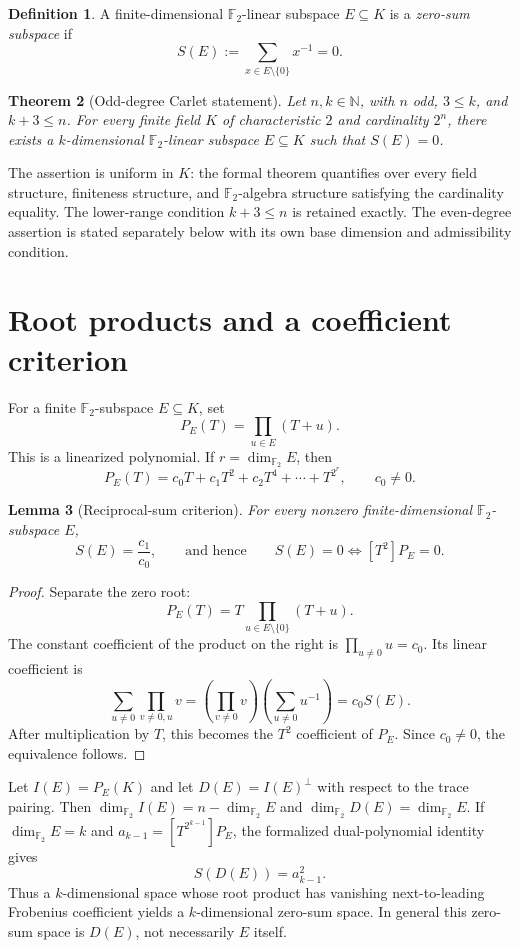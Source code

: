 \documentclass[11pt]{amsart}
\numberwithin{equation}{section}
\newtheorem{theorem}{Theorem}[section]
\newtheorem{lemma}[theorem]{Lemma}
\theoremstyle{definition}
\newtheorem{definition}[theorem]{Definition}
\theoremstyle{remark}
\newcommand{\Ftwo}{\mathbb F_2}
\newcommand{\dimf}{\dim_{\Ftwo}}
\begin{document}
\begin{definition}
A finite-dimensional $\Ftwo$-linear subspace $E\subseteq K$ is a \emph{zero-sum subspace} if
\[
 S(E):=\sum_{x\in E\setminus\{0\}}x^{-1}=0.
\]
\end{definition}

\begin{theorem}[Odd-degree Carlet statement]\label{thm:main}
Let $n,k\in\mathbb N$, with $n$ odd, $3\le k$, and $k+3\le n$. For every finite field $K$ of characteristic $2$ and cardinality $2^n$, there exists a $k$-dimensional $\Ftwo$-linear subspace $E\subseteq K$ such that $S(E)=0$.
\end{theorem}

The assertion is uniform in $K$: the formal theorem quantifies over every field structure, finiteness structure, and $\Ftwo$-algebra structure satisfying the cardinality equality. The lower-range condition $k+3\le n$ is retained exactly. The even-degree assertion is stated separately below with its own base dimension and admissibility condition.

\section{Root products and a coefficient criterion}

For a finite $\Ftwo$-subspace $E\subseteq K$, set
\[
 P_E(T)=\prod_{u\in E}(T+u).
\]
This is a linearized polynomial. If $r=\dimf E$, then
\[
 P_E(T)=c_0T+c_1T^2+c_2T^4+\cdots+T^{2^r},\qquad c_0\ne0.
\]

\begin{lemma}[Reciprocal-sum criterion]\label{lem:coeff}
For every nonzero finite-dimensional $\Ftwo$-subspace $E$,
\[
 S(E)=\frac{c_1}{c_0},\qquad\text{and hence}\qquad
 S(E)=0\Longleftrightarrow [T^2]P_E=0.
\]
\end{lemma}
\begin{proof}
Separate the zero root:
\[
 P_E(T)=T\prod_{u\in E\setminus\{0\}}(T+u).
\]
The constant coefficient of the product on the right is $\prod_{u\ne0}u=c_0$. Its linear coefficient is
\[
 \sum_{u\ne0}\prod_{v\ne0,u}v
 =\left(\prod_{v\ne0}v\right)\left(\sum_{u\ne0}u^{-1}\right)=c_0S(E).
\]
After multiplication by $T$, this becomes the $T^2$ coefficient of $P_E$. Since $c_0\ne0$, the equivalence follows.
\end{proof}

Let $I(E)=P_E(K)$ and let $D(E)=I(E)^\perp$ with respect to the trace pairing. Then $\dimf I(E)=n-\dimf E$ and $\dimf D(E)=\dimf E$. If $\dimf E=k$ and $a_{k-1}=[T^{2^{k-1}}]P_E$, the formalized dual-polynomial identity gives
\begin{equation}\label{eq:duality}
 S(D(E))=a_{k-1}^{2}.
\end{equation}
Thus a $k$-dimensional space whose root product has vanishing next-to-leading Frobenius coefficient yields a $k$-dimensional zero-sum space. In general this zero-sum space is $D(E)$, not necessarily $E$ itself.
\end{document}
